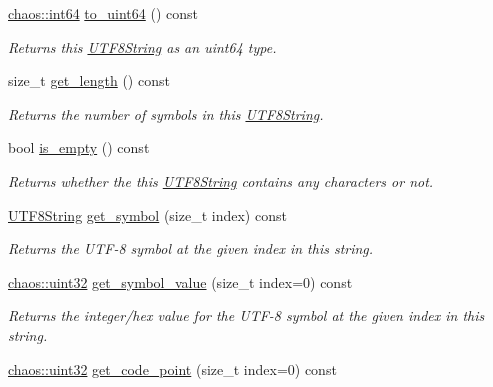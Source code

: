\begin{DoxyCompactItemize}
\hyperlink{namespacechaos_a46c61f58d99879b936f58234b9a05e0c}{chaos\-::int64} \hyperlink{classchaos_1_1uni_1_1_u_t_f8_string_afe8cb74c9fef1767790a33af2179a0b4}{to\-\_\-uint64} () const 
\begin{DoxyCompactList}\small\item\em Returns this \hyperlink{classchaos_1_1uni_1_1_u_t_f8_string}{U\-T\-F8\-String} as an uint64 type. \end{DoxyCompactList}\item 
size\-\_\-t \hyperlink{classchaos_1_1uni_1_1_u_t_f8_string_a25fc75f62483131e35860598f70c96d8}{get\-\_\-length} () const 
\begin{DoxyCompactList}\small\item\em Returns the number of symbols in this \hyperlink{classchaos_1_1uni_1_1_u_t_f8_string}{U\-T\-F8\-String}. \end{DoxyCompactList}\item 
bool \hyperlink{classchaos_1_1uni_1_1_u_t_f8_string_ad99ed42fcbd51651e6d626bab469af59}{is\-\_\-empty} () const 
\begin{DoxyCompactList}\small\item\em Returns whether the this \hyperlink{classchaos_1_1uni_1_1_u_t_f8_string}{U\-T\-F8\-String} contains any characters or not. \end{DoxyCompactList}\item 
\hyperlink{classchaos_1_1uni_1_1_u_t_f8_string}{U\-T\-F8\-String} \hyperlink{classchaos_1_1uni_1_1_u_t_f8_string_a32e14ce1bc404c36fe73741088daaaef}{get\-\_\-symbol} (size\-\_\-t index) const 
\begin{DoxyCompactList}\small\item\em Returns the U\-T\-F-\/8 symbol at the given index in this string. \end{DoxyCompactList}\item 
\hyperlink{namespacechaos_a3b3a47ba1e284655bf1a30c441121c60}{chaos\-::uint32} \hyperlink{classchaos_1_1uni_1_1_u_t_f8_string_a0de9e9c20e4aa5f76daf752788db2039}{get\-\_\-symbol\-\_\-value} (size\-\_\-t index=0) const 
\begin{DoxyCompactList}\small\item\em Returns the integer/hex value for the U\-T\-F-\/8 symbol at the given index in this string. \end{DoxyCompactList}\item 
\hyperlink{namespacechaos_a3b3a47ba1e284655bf1a30c441121c60}{chaos\-::uint32} \hyperlink{classchaos_1_1uni_1_1_u_t_f8_string_a0032f18868d33ca5f5855657c4d2d147}{get\-\_\-code\-\_\-point} (size\-\_\-t index=0) const 

\end{DoxyCompactItemize}
